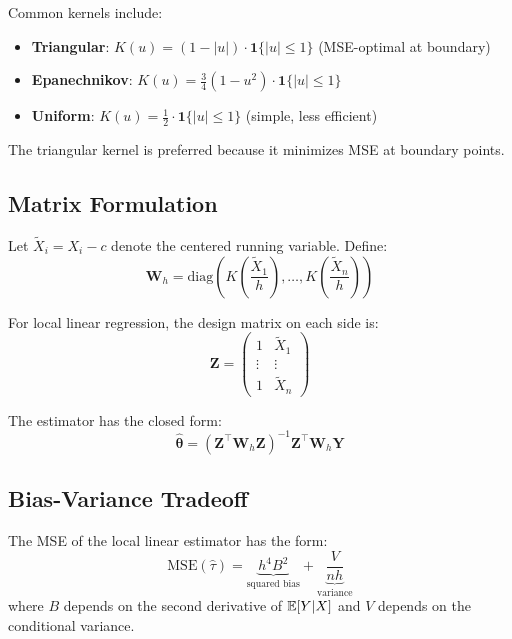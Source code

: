 \begin{remark}
Common kernels include:
\begin{itemize}
    \item \textbf{Triangular}: $K(u) = (1 - |u|) \cdot \mathbf{1}\{|u| \leq 1\}$ (MSE-optimal at boundary)
    \item \textbf{Epanechnikov}: $K(u) = \frac{3}{4}(1 - u^2) \cdot \mathbf{1}\{|u| \leq 1\}$
    \item \textbf{Uniform}: $K(u) = \frac{1}{2} \cdot \mathbf{1}\{|u| \leq 1\}$ (simple, less efficient)
\end{itemize}
The triangular kernel is preferred because it minimizes MSE at boundary points.
\end{remark}

\subsection{Matrix Formulation}

Let $\tilde{X}_i = X_i - c$ denote the centered running variable. Define:
\begin{equation}
    \mathbf{W}_h = \text{diag}\left(K\left(\frac{\tilde{X}_1}{h}\right), \ldots, K\left(\frac{\tilde{X}_n}{h}\right)\right)
\end{equation}

For local linear regression, the design matrix on each side is:
\begin{equation}
    \mathbf{Z} = \begin{pmatrix} 1 & \tilde{X}_1 \\ \vdots & \vdots \\ 1 & \tilde{X}_n \end{pmatrix}
\end{equation}

The estimator has the closed form:
\begin{equation}
    \hat{\boldsymbol{\theta}} = (\mathbf{Z}^\top \mathbf{W}_h \mathbf{Z})^{-1} \mathbf{Z}^\top \mathbf{W}_h \mathbf{Y}
\end{equation}

\subsection{Bias-Variance Tradeoff}

\begin{proposition}
\label{prop:rdd_bias_variance}
The MSE of the local linear estimator has the form:
\begin{equation}
    \text{MSE}(\hat{\tau}) = \underbrace{h^4 B^2}_{\text{squared bias}} + \underbrace{\frac{V}{nh}}_{\text{variance}}
\end{equation}
where $B$ depends on the second derivative of $\mathbb{E}[Y|X]$ and $V$ depends on the conditional variance.
\end{proposition}

